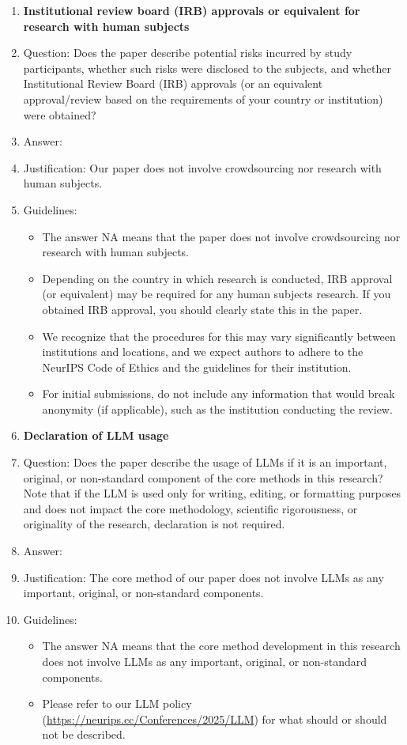 \documentclass{article}
\theoremstyle{plain}
\theoremstyle{definition}
\theoremstyle{remark}
\begin{document}
\begin{enumerate}
\item {\bf Institutional review board (IRB) approvals or equivalent for research with human subjects}
    \item[] Question: Does the paper describe potential risks incurred by study participants, whether such risks were disclosed to the subjects, and whether Institutional Review Board (IRB) approvals (or an equivalent approval/review based on the requirements of your country or institution) were obtained?
    \item[] Answer: \answerNA{} %
    \item[] Justification: Our paper does not involve crowdsourcing nor research with human subjects.
    \item[] Guidelines:
    \begin{itemize}
        \item The answer NA means that the paper does not involve crowdsourcing nor research with human subjects.
        \item Depending on the country in which research is conducted, IRB approval (or equivalent) may be required for any human subjects research. If you obtained IRB approval, you should clearly state this in the paper. 
        \item We recognize that the procedures for this may vary significantly between institutions and locations, and we expect authors to adhere to the NeurIPS Code of Ethics and the guidelines for their institution. 
        \item For initial submissions, do not include any information that would break anonymity (if applicable), such as the institution conducting the review.
    \end{itemize}

\item {\bf Declaration of LLM usage}
    \item[] Question: Does the paper describe the usage of LLMs if it is an important, original, or non-standard component of the core methods in this research? Note that if the LLM is used only for writing, editing, or formatting purposes and does not impact the core methodology, scientific rigorousness, or originality of the research, declaration is not required.
    \item[] Answer: \answerNA{} %
    \item[] Justification: The core method of our paper does not involve LLMs as any important, original, or non-standard components.
    \item[] Guidelines:
    \begin{itemize}
        \item The answer NA means that the core method development in this research does not involve LLMs as any important, original, or non-standard components.
        \item Please refer to our LLM policy (\url{https://neurips.cc/Conferences/2025/LLM}) for what should or should not be described.
    \end{itemize}

\end{enumerate}
\fi
\end{document}
